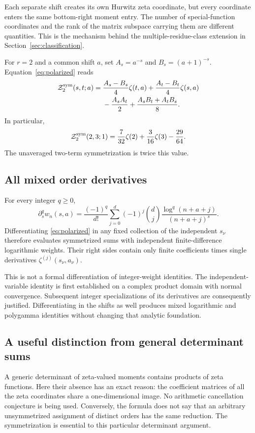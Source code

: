 \begin{remark}
Each separate shift creates its own Hurwitz zeta coordinate, but every
coordinate enters the same bottom-right moment entry. The number of
special-function coordinates and the rank of the matrix subspace carrying
them are different quantities. This is the mechanism behind the
multiple-residue-class extension in Section~\ref{sec:classification}.
\end{remark}

For $r=2$ and a common shift $a$, set
$A_s=a^{-s}$ and $B_s=(a+1)^{-s}$. Equation~\eqref{eq:polarized} reads
\begin{align}
 \mathcal Z_2^{\mathrm{sym}}(s,t;a)
 ={}&\frac{A_s-B_s}{4}\zeta(t,a)
     +\frac{A_t-B_t}{4}\zeta(s,a)\notag\\
 &-\frac{A_sA_t}{2}
     +\frac{A_sB_t+A_tB_s}{8}.
 \label{eq:polarized-r2}
\end{align}
In particular,
\begin{equation}\label{eq:mixed23}
 \mathcal Z_2^{\mathrm{sym}}(2,3;1)
   =\frac7{32}\zeta(2)+\frac3{16}\zeta(3)-\frac{29}{64}.
\end{equation}
The unaveraged two-term symmetrization is twice this value.

\subsection{All mixed order derivatives}
For every integer $q\ge0$,
\begin{equation}\label{eq:order-weight}
 \partial_s^q w_n(s,a)
 =\frac{(-1)^q}{d!}\sum_{j=0}^d(-1)^j\binom dj
       \frac{\log^q(n+a+j)}{(n+a+j)^s}.
\end{equation}
Differentiating \eqref{eq:polarized} in any fixed collection of the
independent $s_\nu$ therefore evaluates symmetrized sums with independent
finite-difference logarithmic weights. Their right sides contain only
finite coefficients times single derivatives
$\zeta^{(j)}(s_\nu,a_\nu)$.

This is not a formal differentiation of integer-weight identities.
The independent-variable identity is first established on a complex
product domain with normal convergence. Subsequent integer specializations
of its derivatives are consequently justified. Differentiating in the
shifts as well produces mixed logarithmic and polygamma identities
without changing that analytic foundation.

\subsection{A useful distinction from general determinant sums}
A generic determinant of zeta-valued moments contains products of zeta
functions. Here their absence has an exact reason: the coefficient
matrices of all the zeta coordinates share a one-dimensional image.
No arithmetic cancellation conjecture is being used. Conversely, the
formula does not say that an arbitrary unsymmetrized assignment of distinct
orders has the same reduction. The symmetrization is essential to this
particular determinant argument.
